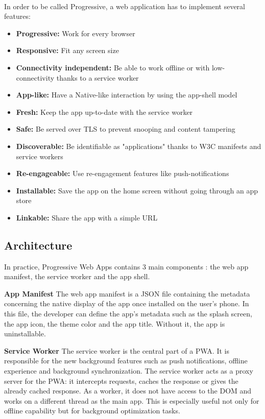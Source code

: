\documentclass{kththesis}
\begin{document}
\paragraph{}
In order to be called Progressive, a web application has to implement several features\cite{PWA_def}:

\begin{itemize}
    \item \textbf{Progressive:} Work for every browser
    \item \textbf{Responsive:} Fit any screen size
    \item \textbf{Connectivity independent:} Be able to work offline or with low-connectivity thanks to a service worker
    \item \textbf{App-like:} Have a Native-like interaction by using the app-shell model
    \item \textbf{Fresh:} Keep the app up-to-date with the service worker
    \item \textbf{Safe:} Be served over TLS to prevent snooping and content tampering
    \item \textbf{Discoverable:} Be identifiable as "applications" thanks to W3C manifests and service workers
    \item \textbf{Re-engageable:} Use re-engagement features like push-notifications
    \item \textbf{Installable:} Save the app on the home screen without going through an app store
    \item \textbf{Linkable:} Share the app with a simple URL
\end{itemize}

\subsection{Architecture}

In practice, Progressive Web Apps contains 3 main components : the web app manifest, the service worker and the app shell. 

\medskip
\textbf{App Manifest} \newline
The web app manifest is a JSON file containing the metadata concerning the native display of the app once installed on the user's phone. In this file, the developer can define the app's metadata such as the splash screen, the app icon, the theme color and the app title. Without it, the app is uninstallable.

\medskip
\textbf{Service Worker} \newline
The service worker is the central part of a PWA. It is responsible for the new background features such as push notifications, offline experience and background synchronization\cite{SW_def}. The service worker acts as a proxy server for the PWA: it intercepts requests, caches the response or gives the already cached response. As a worker, it does not have access to the DOM and works on a different thread as the main app. This is especially useful not only for offline capability but for background optimization tasks.
\end{document}
